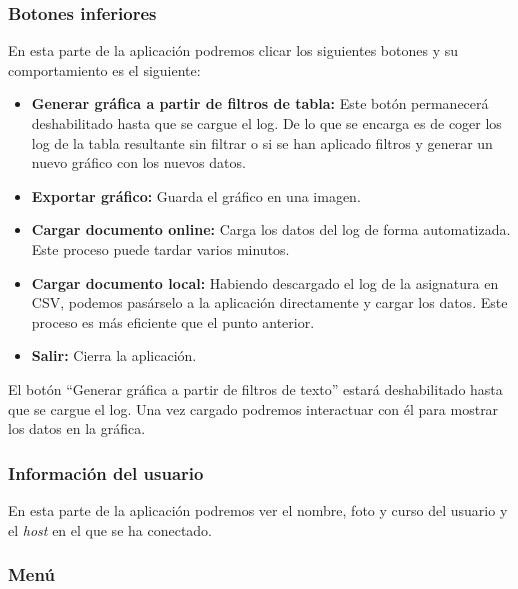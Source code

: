 
\subsubsection{Botones inferiores}

En esta parte de la aplicación podremos clicar los siguientes botones y su comportamiento es el siguiente:

\begin{itemize}
	\tightlist
	\item
	\textbf{Generar gráfica a partir de filtros de tabla:} Este botón permanecerá deshabilitado hasta que se cargue el log. De lo que se encarga es de coger los log de la tabla resultante sin filtrar o si se han aplicado filtros y generar un nuevo gráfico con los nuevos datos.
	\item
	\textbf{Exportar gráfico:} Guarda el gráfico en una imagen.
	\item
	\textbf{Cargar documento online:} Carga los datos del log de forma automatizada. Este proceso puede tardar varios minutos.
	\item
	\textbf{Cargar documento local:} Habiendo descargado el log de la asignatura en CSV, podemos pasárselo a la aplicación directamente y cargar los datos. Este proceso es más eficiente que el punto anterior.
\newpage	\item
	\textbf{Salir:} Cierra la aplicación.
	
	
\end{itemize}


El botón ``Generar gráfica a partir de filtros de texto'' estará deshabilitado hasta que se cargue el log. Una vez cargado podremos interactuar con él para mostrar los datos en la gráfica.

\subsubsection{Información del usuario}

En esta parte de la aplicación podremos ver el nombre, foto y curso del usuario y el \emph{host} en el que se ha conectado.


\subsubsection{Menú}

